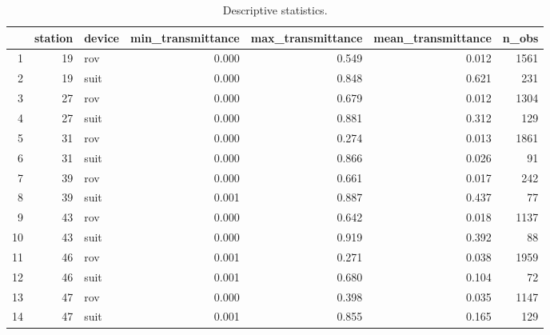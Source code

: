 \begin{table}[ht]
\centering
\begin{tabular}{rrlrrrr}
  \hline
 & station & device & min\_transmittance & max\_transmittance & mean\_transmittance & n\_obs \\ 
  \hline
1 &   19 & rov & 0.000 & 0.549 & 0.012 & 1561 \\ 
  2 &   19 & suit & 0.000 & 0.848 & 0.621 &  231 \\ 
  3 &   27 & rov & 0.000 & 0.679 & 0.012 & 1304 \\ 
  4 &   27 & suit & 0.000 & 0.881 & 0.312 &  129 \\ 
  5 &   31 & rov & 0.000 & 0.274 & 0.013 & 1861 \\ 
  6 &   31 & suit & 0.000 & 0.866 & 0.026 &   91 \\ 
  7 &   39 & rov & 0.000 & 0.661 & 0.017 &  242 \\ 
  8 &   39 & suit & 0.001 & 0.887 & 0.437 &   77 \\ 
  9 &   43 & rov & 0.000 & 0.642 & 0.018 & 1137 \\ 
  10 &   43 & suit & 0.000 & 0.919 & 0.392 &   88 \\ 
  11 &   46 & rov & 0.001 & 0.271 & 0.038 & 1959 \\ 
  12 &   46 & suit & 0.001 & 0.680 & 0.104 &   72 \\ 
  13 &   47 & rov & 0.000 & 0.398 & 0.035 & 1147 \\ 
  14 &   47 & suit & 0.001 & 0.855 & 0.165 &  129 \\ 
   \hline
\end{tabular}
\caption{Descriptive statistics.} 
\end{table}
